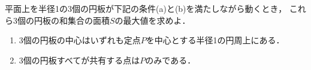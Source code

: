 \documentclass[../../main.tex]{subfiles}
\begin{document}
平面上を半径1の3個の円板が下記の条件(a)と(b)を満たしながら動くとき，
これら3個の円板の和集合の面積$S$の最大値を求めよ．
\begin{enumerate}
  \item[(a)] 3個の円板の中心はいずれも定点$P$を中心とする半径1の円周上にある．
  \item[(b)] 3個の円板すべてが共有する点は$P$のみである．
\end{enumerate}
\end{document}
